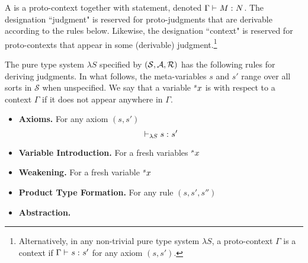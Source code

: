 \documentclass{article}
\begin{document}
A  is a proto-context together with statement, denoted $\judgment \Gamma M N$.
The designation ``judgment" is reserved for proto-judgments that are derivable according to the rules below.
Likewise, the designation ``context" is reserved for proto-contexts that appear in some (derivable) judgment.\footnote{Alternatively, in any non-trivial pure type system $\lambda S$, a proto-context $\Gamma$ is a context if $\judgment \Gamma s {s'}$ for any axiom $(s, s')$.}

\begin{definition}
The pure type system $\lambda S$ specified by $(\sorts, \axioms, \rules)$ has the following rules for deriving judgments.
In what follows, the meta-variables $s$ and $s'$ range over all sorts in $\mathcal S$ when unspecified.
We say that a variable $\avar s x$ is  with respect to a context $\Gamma$ if it does not appear anywhere in $\Gamma$.

\begin{itemize}
\item
\textbf{Axioms.} For any axiom $(s, s')$
\[
    \judgment[\lS] {} {s} {s'}
\]

\item
\textbf{Variable Introduction.} For a fresh variables $\avar s x$
\begin{prooftree}

\end{prooftree}

\item
\textbf{Weakening.} For a fresh variable $\avar s x$
\begin{prooftree}
\end{prooftree}
	
\item
\textbf{Product Type Formation.} For any rule $(s, s', s'')$
\begin{prooftree}
\end{prooftree}

\item
\textbf{Abstraction.}
\begin{prooftree}
\end{prooftree}


\end{itemize}
\end{definition}
\end{document}
